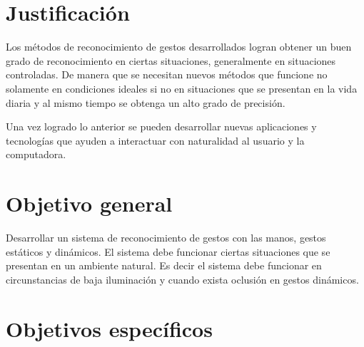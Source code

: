 
\section{Justificaci\'on}\label{sec:Just}

Los métodos de reconocimiento de gestos desarrollados logran obtener un buen grado de reconocimiento en ciertas situaciones, generalmente en situaciones controladas.
De manera que se necesitan nuevos métodos que funcione no solamente en condiciones ideales si no en situaciones que se presentan en la vida diaria y al mismo tiempo se obtenga un alto grado de precisión.  

Una vez logrado lo anterior se pueden desarrollar nuevas aplicaciones y tecnologías que ayuden a interactuar con naturalidad al usuario y la computadora.




\section{Objetivo general}\label{sec:ObjetivoGeneral}
 
Desarrollar un sistema de reconocimiento de gestos con las manos, gestos estáticos y dinámicos. El sistema debe funcionar ciertas situaciones que se presentan en un ambiente natural. Es decir el sistema debe  funcionar en circunstancias de baja iluminación y cuando exista oclusión en gestos dinámicos.




\section{Objetivos espec\'ificos}\label{sec:objetivosEspecificos}

